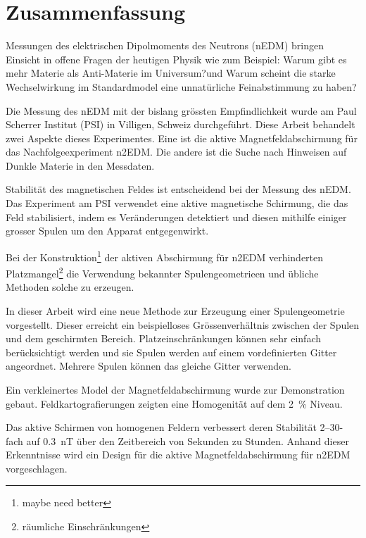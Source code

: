 

\begingroup
\let\clearpage\relax
\let\cleardoublepage\relax
\let\cleardoublepage\relax

\chapter*{Zusammenfassung} %

\newcommand{\jkfootnote}[1]{\footnote{#1}}

Messungen des elektrischen Dipolmoments des Neutrons (nEDM) bringen Einsicht in offene Fragen der heutigen Physik wie zum Beispiel: \glqq{}Warum gibt es mehr Materie als Anti-Materie im Universum?\grqq und \glqq{}Warum scheint die starke Wechselwirkung im Standardmodel eine unnatürliche Feinabstimmung zu haben?\grqq

Die Messung des nEDM mit der bislang grössten Empfindlichkeit wurde am Paul Scherrer Institut (PSI) in Villigen, Schweiz durchgeführt.
Diese Arbeit behandelt zwei Aspekte dieses Experimentes. Eine ist die aktive Magnetfeldabschirmung  für das Nachfolgeexperiment n2EDM\@.
Die andere ist die Suche nach Hinweisen auf Dunkle Materie in den Messdaten.

Stabilität des magnetischen Feldes ist entscheidend bei der Messung des nEDM\@.
Das Experiment am PSI verwendet eine aktive magnetische Schirmung, die das Feld stabilisiert, indem es Veränderungen detektiert und diesen mithilfe einiger grosser Spulen um den Apparat entgegenwirkt.

Bei der Konstruktion\jkfootnote{maybe need better} der aktiven Abschirmung für n2EDM verhinderten Platzmangel\jkfootnote{räumliche Einschränkungen} die Verwendung bekannter Spulengeometrieen und übliche Methoden solche zu erzeugen.

In dieser Arbeit wird eine neue Methode zur Erzeugung einer Spulengeometrie vorgestellt. Dieser erreicht ein beispielloses Grössenverhältnis zwischen der Spulen und dem geschirmten Bereich.
Platzeinschränkungen können sehr einfach berücksichtigt werden und sie Spulen werden auf einem vordefinierten Gitter angeordnet. Mehrere Spulen können das gleiche Gitter verwenden.

Ein verkleinertes Model der Magnetfeldabschirmung wurde zur Demonstration gebaut. Feldkartografierungen zeigten eine Homogenität auf dem \SI{2}{\percent} Niveau.

Das aktive Schirmen von homogenen Feldern verbessert deren Stabilität 2--30-fach auf \SI{0.3}{nT} über den Zeitbereich von Sekunden zu Stunden.
Anhand dieser Erkenntnisse wird ein Design für die aktive Magnetfeldabschirmung für n2EDM vorgeschlagen.

